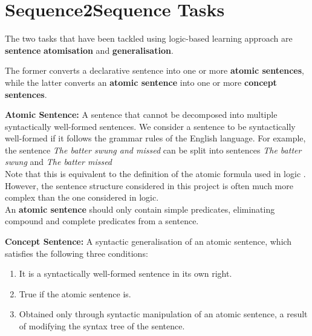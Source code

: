 
 
\section{Sequence2Sequence Tasks}
\label{sentence-type-definitions}

The two tasks that have been tackled using logic-based learning approach are \textbf{sentence} \textbf{atomisation} and \textbf{generalisation}.

The former converts a declarative sentence into one or more \textbf{atomic sentences}, while the latter converts an \textbf{atomic sentence} into one or more \textbf{concept sentences}.

\textbf{Atomic Sentence:} A sentence that cannot be decomposed into multiple syntactically well-formed sentences. 
We consider a sentence to be syntactically well-formed if it follows the grammar rules of the English language. 
For example, the sentence \emph{The batter swung and missed} can be split into sentences \emph{The batter swung} and \emph{The batter missed} \\
Note that this is equivalent to the definition of the atomic formula used in logic \cite{RefWorks:RefID:96-hinman2018fundamentals}.
However, the sentence structure considered in this project is often much more complex than the one considered in logic.\\
An \textbf{atomic sentence} should only contain simple predicates, eliminating compound and complete predicates from a sentence.


\textbf{Concept Sentence:} A syntactic generalisation of an atomic sentence, which satisfies the following three conditions:
\begin{enumerate}
    \item It is a syntactically well-formed sentence in its own right.
    \item True if the atomic sentence is.
    \item Obtained only through syntactic manipulation of an atomic sentence, a result of modifying the syntax tree of the sentence.
\end{enumerate}

